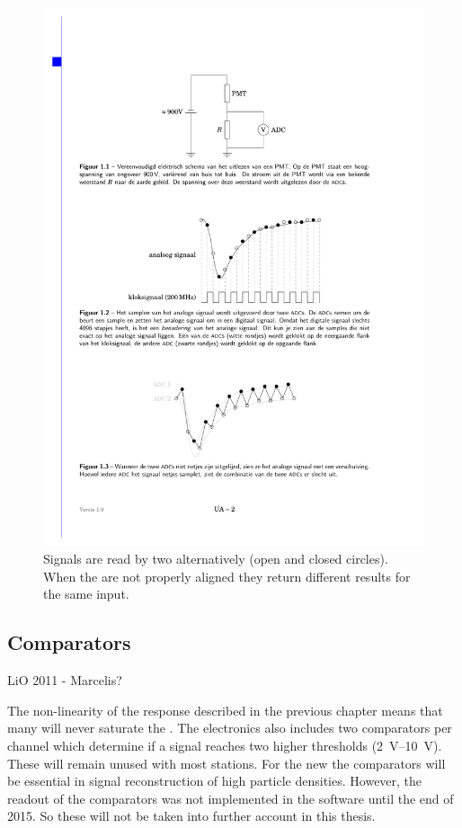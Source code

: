 \begin{figure}
    \centering
    \includegraphics{plots/station/adc_alignment}
    \caption{Signals are read by two \adcs alternatively (open and closed circles). When the \adcs are not properly aligned they return different results for the same input.}
    \label{fig:adc_alignment}
\end{figure}


\subsection{Comparators}

LiO 2011 - Marcelis?

The non-linearity of the \pmt response described in the previous chapter means that many \pmts will never saturate the \adcs. The \hisparc electronics also includes two comparators per channel which determine if a signal reaches two higher thresholds (\SIrange{2}{10}{\volt}). These will remain unused with most stations. For the new \pmts the comparators will be essential in signal reconstruction of high particle densities. However, the readout of the comparators was not implemented in the software until the end of 2015. So these will not be taken into further account in this thesis.


